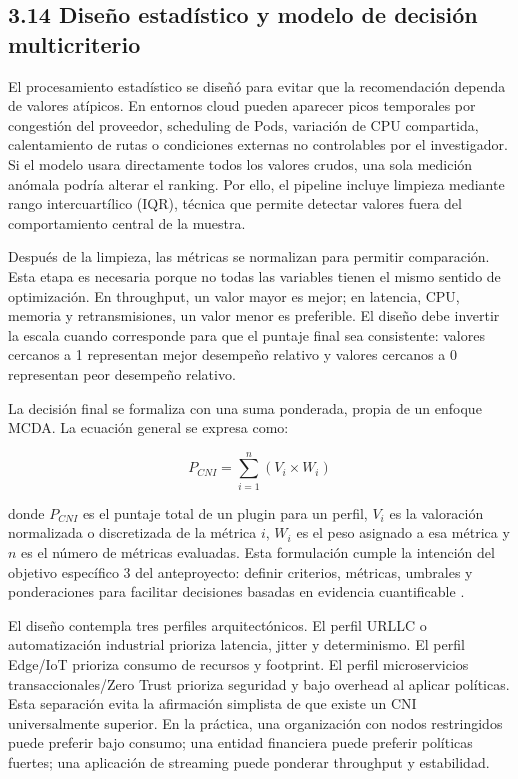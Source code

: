 \documentclass[journal]{IEEEtran}
\begin{document}
\subsection{3.14 Diseño estadístico y modelo de decisión multicriterio}

El procesamiento estadístico se diseñó para evitar que la recomendación dependa de valores atípicos. En entornos cloud pueden aparecer picos temporales por congestión del proveedor, scheduling de Pods, variación de CPU compartida, calentamiento de rutas o condiciones externas no controlables por el investigador. Si el modelo usara directamente todos los valores crudos, una sola medición anómala podría alterar el ranking. Por ello, el pipeline incluye limpieza mediante rango intercuartílico (IQR), técnica que permite detectar valores fuera del comportamiento central de la muestra.

Después de la limpieza, las métricas se normalizan para permitir comparación. Esta etapa es necesaria porque no todas las variables tienen el mismo sentido de optimización. En throughput, un valor mayor es mejor; en latencia, CPU, memoria y retransmisiones, un valor menor es preferible. El diseño debe invertir la escala cuando corresponde para que el puntaje final sea consistente: valores cercanos a 1 representan mejor desempeño relativo y valores cercanos a 0 representan peor desempeño relativo.

La decisión final se formaliza con una suma ponderada, propia de un enfoque MCDA. La ecuación general se expresa como:

\[
P_{CNI}=\sum_{i=1}^{n}(V_i \times W_i)
\]

donde \(P_{CNI}\) es el puntaje total de un plugin para un perfil, \(V_i\) es la valoración normalizada o discretizada de la métrica \(i\), \(W_i\) es el peso asignado a esa métrica y \(n\) es el número de métricas evaluadas. Esta formulación cumple la intención del objetivo específico 3 del anteproyecto: definir criterios, métricas, umbrales y ponderaciones para facilitar decisiones basadas en evidencia cuantificable \cite{ref29}.

El diseño contempla tres perfiles arquitectónicos. El perfil URLLC o automatización industrial prioriza latencia, jitter y determinismo. El perfil Edge/IoT prioriza consumo de recursos y footprint. El perfil microservicios transaccionales/Zero Trust prioriza seguridad y bajo overhead al aplicar políticas. Esta separación evita la afirmación simplista de que existe un CNI universalmente superior. En la práctica, una organización con nodos restringidos puede preferir bajo consumo; una entidad financiera puede preferir políticas fuertes; una aplicación de streaming puede ponderar throughput y estabilidad.
\end{document}
